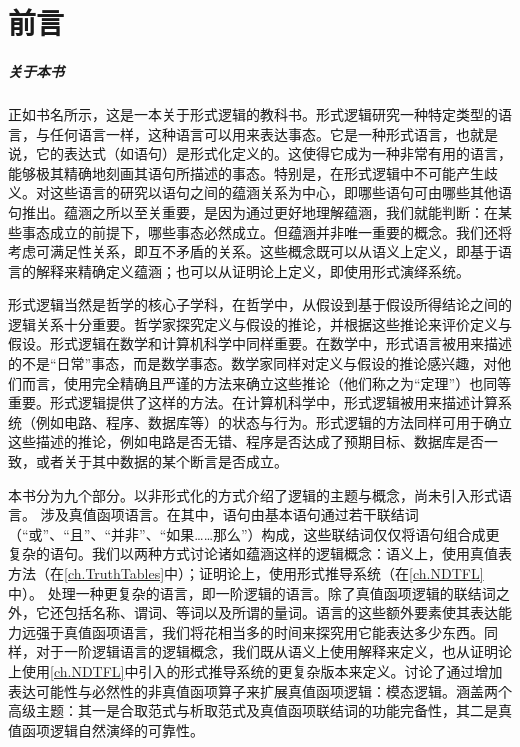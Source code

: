 \chapter{前言}\label{preface}

\paragraph{关于本书}

正如书名所示，这是一本关于形式逻辑的教科书。形式逻辑研究一种特定类型的语言，与任何语言一样，这种语言可以用来表达事态。它是一种形式语言，也就是说，它的表达式（如语句）是形式化定义的。这使得它成为一种非常有用的语言，能够极其精确地刻画其语句所描述的事态。特别是，在形式逻辑中不可能产生歧义。对这些语言的研究以语句之间的蕴涵关系为中心，即哪些语句可由哪些其他语句推出。蕴涵之所以至关重要，是因为通过更好地理解蕴涵，我们就能判断：在某些事态成立的前提下，哪些事态必然成立。但蕴涵并非唯一重要的概念。我们还将考虑可满足性关系，即互不矛盾的关系。这些概念既可以从语义上定义，即基于语言的解释来精确定义蕴涵；也可以从证明论上定义，即使用形式演绎系统。

形式逻辑当然是哲学的核心子学科，在哲学中，从假设到基于假设所得结论之间的逻辑关系十分重要。哲学家探究定义与假设的推论，并根据这些推论来评价定义与假设。形式逻辑在数学和计算机科学中同样重要。在数学中，形式语言被用来描述的不是“日常”事态，而是数学事态。数学家同样对定义与假设的推论感兴趣，对他们而言，使用完全精确且严谨的方法来确立这些推论（他们称之为“定理”）也同等重要。形式逻辑提供了这样的方法。在计算机科学中，形式逻辑被用来描述计算系统（例如电路、程序、数据库等）的状态与行为。形式逻辑的方法同样可用于确立这些描述的推论，例如电路是否无错、程序是否达成了预期目标、数据库是否一致，或者关于其中数据的某个断言是否成立。

本书分为九个部分。以非形式化的方式介绍了逻辑的主题与概念，尚未引入形式语言。 涉及真值函项语言。在其中，语句由基本语句通过若干联结词（“或”、“且”、“并非”、“如果……那么”）构成，这些联结词仅仅将语句组合成更复杂的语句。我们以两种方式讨论诸如蕴涵这样的逻辑概念：语义上，使用真值表方法（在\cref{ch.TruthTables}中）；证明论上，使用形式推导系统（在\cref{ch.NDTFL}中）。 处理一种更复杂的语言，即一阶逻辑的语言。除了真值函项逻辑的联结词之外，它还包括名称、谓词、等词以及所谓的量词。语言的这些额外要素使其表达能力远强于真值函项语言，我们将花相当多的时间来探究用它能表达多少东西。同样，对于一阶逻辑语言的逻辑概念，我们既从语义上使用解释来定义，也从证明论上使用\cref{ch.NDTFL}中引入的形式推导系统的更复杂版本来定义。讨论了通过增加表达可能性与必然性的非真值函项算子来扩展真值函项逻辑：模态逻辑。涵盖两个高级主题：其一是合取范式与析取范式及真值函项联结词的功能完备性，其二是真值函项逻辑自然演绎的可靠性。

